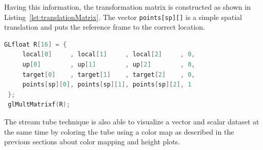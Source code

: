 Having this information, the transformation matrix is constructed as shown in Listing~\ref{lst:translationMatrix}. The vector \verb|points[sp][]| is a simple spatial translation and puts the reference frame to the correct location.

 \begin{lstlisting}[language=C, caption={Rotation and translation matrix to move cross-section along the streamtube.},label={lst:translationMatrix}]
 GLfloat R[16] = {
     local[0]     , local[1]     , local[2]     , 0,
     up[0]        , up[1]        , up[2]        , 0,
     target[0]    , target[1]    , target[2]    , 0,
     points[sp][0], points[sp][1], points[sp][2], 1
 };
 glMultMatrixf(R);
 \end{lstlisting}
 
The stream tube technique is also able to visualize a vector and scalar dataset at the same time by coloring the tube using a color map as described in the previous sections about color mapping and height plots.

